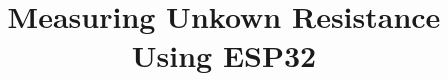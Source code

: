\documentclass[journal,12pt,twocolumn]{IEEEtran}
\begin{document}





\def\putbox#1#2#3{\makebox[0in][l]{\makebox[#1][l]{}\raisebox{\baselineskip}[0in][0in]{\raisebox{#2}[0in][0in]{#3}}}}
     \def\rightbox#1{\makebox[0in][r]{#1}}
     \def\centbox#1{\makebox[0in]{#1}}
     \def\topbox#1{\raisebox{-\baselineskip}[0in][0in]{#1}}
     \def\midbox#1{\raisebox{-0.5\baselineskip}[0in][0in]{#1}}

\vspace{3cm}

\title{ 
	Measuring Unkown Resistance Using ESP32
}


%
%
%
\end{document}
